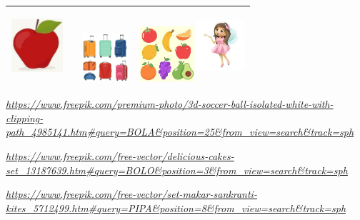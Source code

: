 \begin{longtable}[]{@{}ll@{}}
\begin{minipage}[t]{0.48\columnwidth}
\includegraphics[width=0.77569in,height=0.78125in]{media/image61.jpg}\strut
\end{minipage} & \begin{minipage}[t]{0.48\columnwidth}\raggedright\strut
\includegraphics[width=0.93472in,height=0.70486in]{media/image55.jpg}\includegraphics[width=0.85347in,height=0.80208in]{media/image62.jpg}\includegraphics[width=0.70833in,height=1.05957in]{media/image63.jpg}\strut
\end{minipage}\tabularnewline
\bottomrule
\end{longtable}

\href{https://www.freepik.com/premium-photo/3d-soccer-ball-isolated-white-with-clipping-path_4985141.htm\#query=BOLA\&position=25\&from_view=search\&track=sph}{\emph{https://www.freepik.com/premium-photo/3d-soccer-ball-isolated-white-with-clipping-path\_4985141.htm\#query=BOLA\&position=25\&from\_view=search\&track=sph}}

\href{https://www.freepik.com/free-vector/delicious-cakes-set_13187639.htm\#query=BOLO\&position=3\&from_view=search\&track=sph}{\emph{https://www.freepik.com/free-vector/delicious-cakes-set\_13187639.htm\#query=BOLO\&position=3\&from\_view=search\&track=sph}}

\href{https://www.freepik.com/free-vector/set-makar-sankranti-kites_5712499.htm\#query=PIPA\&position=8\&from_view=search\&track=sph}{\emph{https://www.freepik.com/free-vector/set-makar-sankranti-kites\_5712499.htm\#query=PIPA\&position=8\&from\_view=search\&track=sph}}

